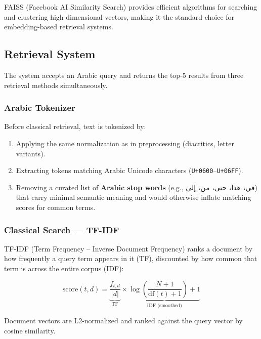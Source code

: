 \medskip
\noindent FAISS (Facebook AI Similarity Search) provides efficient algorithms for searching and clustering high-dimensional vectors, making it the standard choice for embedding-based retrieval systems.

\subsection{Retrieval System}

The system accepts an Arabic query and returns the top-5 results from three retrieval methods simultaneously.

\subsubsection{Arabic Tokenizer}

Before classical retrieval, text is tokenized by:
\begin{enumerate}
  \item Applying the same normalization as in preprocessing (diacritics, letter variants).
  \item Extracting tokens matching Arabic Unicode characters (\texttt{U+0600}--\texttt{U+06FF}).
  \item Removing a curated list of \textbf{Arabic stop words} (e.g., \textarabic{في، هذا، حتى، من، إلى}) that carry minimal semantic meaning and would otherwise inflate matching scores for common terms.
\end{enumerate}

\subsubsection{Classical Search --- TF-IDF}

TF-IDF (Term Frequency -- Inverse Document Frequency) ranks a document by how frequently a query term appears in it (TF), discounted by how common that term is across the entire corpus (IDF):

\begin{equation}
  \text{score}(t, d) = \underbrace{\frac{f_{t,d}}{|d|}}_{\text{TF}} \times \underbrace{\log\!\left(\frac{N+1}{\text{df}(t)+1}\right)+1}_{\text{IDF (smoothed)}}
\end{equation}

Document vectors are L2-normalized and ranked against the query vector by cosine similarity.


